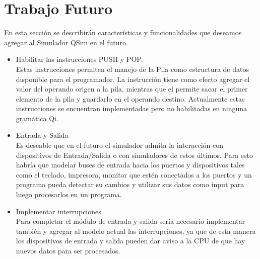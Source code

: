 \section{Trabajo Futuro}

En esta sección se describirán características y funcionalidades que deseamos agregar al Simulador QSim en el futuro.

\begin{itemize}

\item Habilitar las instrucciones PUSH y POP.\\

Estas instrucciones permiten el manejo de la Pila como estructura de datos disponible para el programador. La instrucción  tiene como efecto agregar el valor del operando origen a la pila, mientras que el  permite sacar el primer elemento de la pila y guardarlo en el operando destino. Actualmente estas instrucciones se encuentran implementadas pero no habilitadas en ninguna gramática Qi.

\item Entrada y Salida\\

Es deseable que en el futuro el simulador admita la interacción con dispositivos de Entrada/Salida o con simuladores de estos últimos. Para esto habría que modelar buses de entrada hacia los puertos y dispositivos tales como el teclado, impresora, monitor que estén conectados a los puertos y un programa pueda detectar su cambios y utilizar sus datos como input para luego procesarlos en un programa.

\item Implementar interrupciones\\

Para completar el módulo de entrada y salida sería necesario implementar también y agregar al modelo actual las interrupciones, ya que de esta manera los dispositivos de entrada y salida pueden dar aviso a la CPU de que hay nuevos datos para ser procesados.

\end{itemize}
